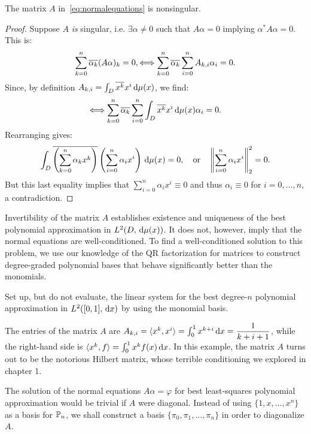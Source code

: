 \begin{theorem}
The matrix $A$ in~\eqref{eq:normalequations} is nonsingular.
\end{theorem}
\begin{proof}
Suppose $A$ {\em is} singular, i.e. $\exists \alpha\ne 0$ such that $A\alpha = 0$ implying $\alpha^* A\alpha = 0$. This is:
\begin{equation}
\sum_{k=0}^n\conj{\alpha_k}(A\alpha)_k = 0, \Longleftrightarrow \sum_{k=0}^n\conj{\alpha_k}\sum_{i=0}^nA_{k,i}\alpha_i = 0.
\end{equation}
Since, by definition $A_{k,i} = \int_D \conj{x^k}x^i\ud\mu(x)$, we find:
\begin{equation}
\Longleftrightarrow \sum_{k=0}^n \conj{\alpha_k} \sum_{i=0}^n \int_D \conj{x^k}x^i\ud\mu(x) \alpha_i = 0.
\end{equation}
Rearranging gives:
\begin{equation}
\int_D\conj{\pr(\sum_{k=0}^n \alpha_kx^k)}\pr(\sum_{i=0}^n \alpha_ix^i)\ud\mu(x) = 0,\quad{\rm or}\quad \left\|\sum_{i=0}^n \alpha_i x^i\right\|_2^2 = 0.
\end{equation}
But this last equality implies that $\sum_{i=0}^n\alpha_ix^i\equiv0$ and thus $\alpha_i\equiv0$ for $i=0,\ldots,n$, a contradiction.
\end{proof}
Invertibility of the matrix $A$ establishes existence and uniqueness of the best polynomial approximation in $L^2(D,\ud\mu(x))$. It does not, however, imply that the normal equations are well-conditioned. To find a well-conditioned solution to this problem, we use our knowledge of the QR factorization for matrices to construct degree-graded polynomial bases that behave significantly better than the monomials.

\begin{example}
Set up, but do not evaluate, the linear system for the best degree-$n$ polynomial approximation in $L^2([0,1],\ud x)$ by using the monomial basis.

The entries of the matrix $A$ are $A_{k,i} = \langle x^k, x^i\rangle = \int_0^1 x^{k+i}\ud x = \dfrac{1}{k+i+1}$, while the right-hand side is $\langle x^k, f\rangle = \int_0^1x^k f(x)\ud x$. In this example, the matrix $A$ turns out to be the notorious Hilbert matrix, whose terrible conditioning we explored in chapter 1.
\end{example}

The solution of the normal equations $A\alpha = \varphi$ for best least-squares polynomial approximation would be trivial if $A$ were diagonal. Instead of using $\{1,x,\ldots,x^n\}$ as a basis for $\P_n$, we shall construct a basis $\{\pi_0,\pi_1,\ldots,\pi_n\}$ in order to diagonalize $A$.

